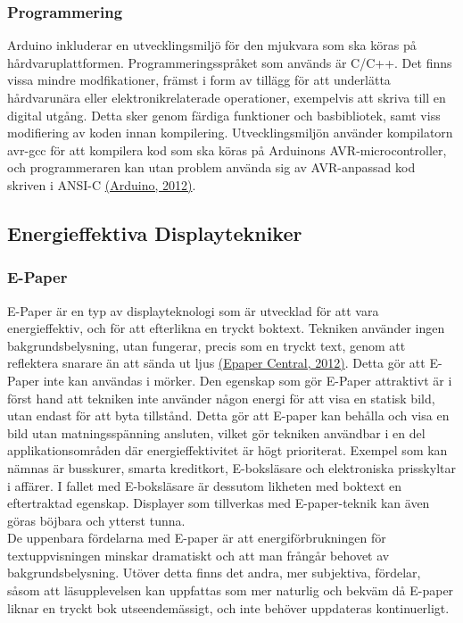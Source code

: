\documentclass[a4paper,11pt]{article}
\begin{document}
\subsubsection{Programmering}	
Arduino inkluderar en utvecklingsmiljö för den mjukvara som ska köras på hårdvaruplattformen. Programmeringsspråket som används är C/C++. Det finns vissa mindre modfikationer, främst i form av tillägg för att underlätta hårdvarunära eller elektronikrelaterade operationer, exempelvis att skriva till en digital utgång. Detta sker genom färdiga funktioner och basbibliotek, samt viss modifiering av koden innan kompilering. Utvecklingsmiljön använder kompilatorn avr-gcc för att kompilera kod som ska köras på Arduinons AVR-microcontroller, och programmeraren kan utan problem använda sig av AVR-anpassad kod skriven i ANSI-C \hyperref[arduino]{(Arduino, 2012)}.

\subsection{Energieffektiva Displaytekniker}

\subsubsection{E-Paper}
E-Paper är en typ av displayteknologi som är utvecklad för att vara energieffektiv, och för att efterlikna en tryckt boktext. Tekniken använder ingen bakgrundsbelysning, utan fungerar, precis som en tryckt text, genom att reflektera snarare än att sända ut ljus \hyperref[epapercentral]{(Epaper Central, 2012)}. Detta gör att E-Paper inte kan användas i mörker. Den egenskap som gör E-Paper attraktivt är i först hand att tekniken inte använder någon energi för att visa en statisk bild, utan endast för att byta tillstånd. Detta gör att E-paper kan behålla och visa en bild utan matningsspänning ansluten, vilket gör tekniken användbar i en del applikationsområden där energieffektivitet är högt prioriterat. Exempel som kan nämnas är busskurer, smarta kreditkort, E-boksläsare och elektroniska prisskyltar i affärer. I fallet med E-boksläsare är dessutom likheten med boktext en eftertraktad egenskap. Displayer som tillverkas med E-paper-teknik kan även göras böjbara och ytterst tunna. \\

De uppenbara fördelarna med E-paper är att energiförbrukningen för textuppvisningen minskar dramatiskt och att man frångår behovet av bakgrundsbelysning. Utöver detta finns det andra, mer subjektiva, fördelar, såsom att läsupplevelsen kan uppfattas som mer naturlig och bekväm då E-paper liknar en tryckt bok utseendemässigt, och inte behöver uppdateras kontinuerligt. \\
\end{document}
